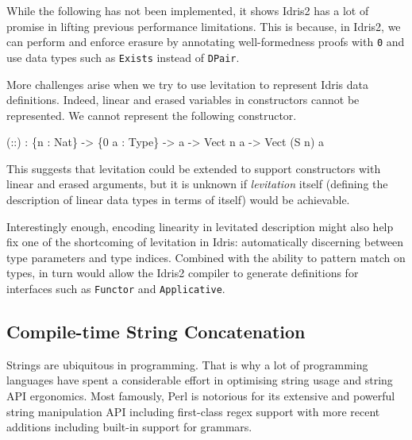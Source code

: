 \documentclass[
]{article}
\newenvironment{Shaded}{}{}
\newcommand{\DataTypeTok}[1]{\textcolor[rgb]{0.56,0.13,0.00}{#1}}
\newcommand{\DecValTok}[1]{\textcolor[rgb]{0.25,0.63,0.44}{#1}}
\newcommand{\NormalTok}[1]{#1}
\newcommand{\OperatorTok}[1]{\textcolor[rgb]{0.40,0.40,0.40}{#1}}
\newcommand{\OtherTok}[1]{\textcolor[rgb]{0.00,0.44,0.13}{#1}}
\begin{document}
While the following has not been implemented, it shows Idris2 has a lot
of promise in lifting previous performance limitations. This is because,
in Idris2, we can perform and enforce erasure by annotating
well-formedness proofs with \texttt{0} and use data types such as
\texttt{Exists} instead of \texttt{DPair}.

More challenges arise when we try to use levitation to represent Idris
data definitions. Indeed, linear and erased variables in constructors
cannot be represented. We cannot represent the following constructor.

\begin{Shaded}
\begin{Highlighting}[]
\NormalTok{(}\OtherTok{::}\NormalTok{) }\OperatorTok{:}\NormalTok{ \{n }\OperatorTok{:} \DataTypeTok{Nat}\NormalTok{\} }\OtherTok{{-}\textgreater{}}\NormalTok{ \{}\DecValTok{0}\NormalTok{ a }\OperatorTok{:} \DataTypeTok{Type}\NormalTok{\} }\OtherTok{{-}\textgreater{}}\NormalTok{ a }\OtherTok{{-}\textgreater{}} \DataTypeTok{Vect}\NormalTok{ n a }\OtherTok{{-}\textgreater{}} \DataTypeTok{Vect}\NormalTok{ (}\DataTypeTok{S}\NormalTok{ n) a }
\end{Highlighting}
\end{Shaded}

This suggests that levitation could be extended to support constructors
with linear and erased arguments, but it is unknown if \emph{levitation}
itself (defining the description of linear data types in terms of
itself) would be achievable.

Interestingly enough, encoding linearity in levitated description might
also help fix one of the shortcoming of levitation in Idris:
automatically discerning between type parameters and type indices.
Combined with the ability to pattern match on types, in turn would allow
the Idris2 compiler to generate definitions for interfaces such as
\texttt{Functor} and \texttt{Applicative}.

\hypertarget{compile-time-string-concatenation}{%
\subsection{Compile-time String
Concatenation}\label{compile-time-string-concatenation}}

Strings are ubiquitous in programming. That is why a lot of programming
languages have spent a considerable effort in optimising string usage
and string API ergonomics. Most famously, Perl is notorious for its
extensive and powerful string manipulation API including first-class
regex support with more recent additions including built-in support for
grammars.
\end{document}
